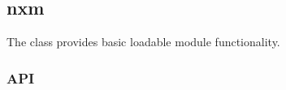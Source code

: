 %
%
%
%
%

\subsection{nxm}
\label{nxm}

The  class provides basic loadable module functionality.

\subsubsection{API}
